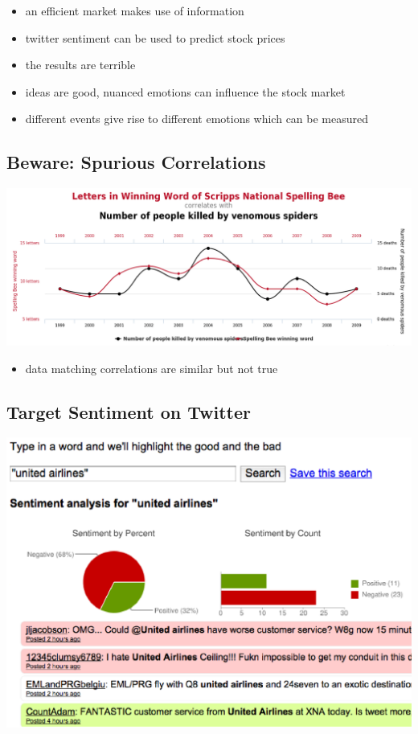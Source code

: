 \documentclass[11pt]{article}
\theoremstyle{definition}
\begin{document}
\begin{itemize}
  \item an efficient market makes use of information
  \item twitter sentiment can be used to predict stock prices
  \item the results are terrible
  \item ideas are good, nuanced emotions can influence the stock market
  \item different events give rise to different emotions which can be measured
\end{itemize}

\subsection{Beware: Spurious Correlations}
\includegraphics[width=\textwidth]{10.png}
\begin{itemize}
  \item data matching correlations are similar but not true
\end{itemize}

\subsection{Target Sentiment on Twitter}
\includegraphics[width=\textwidth]{11.png}
\end{document}
